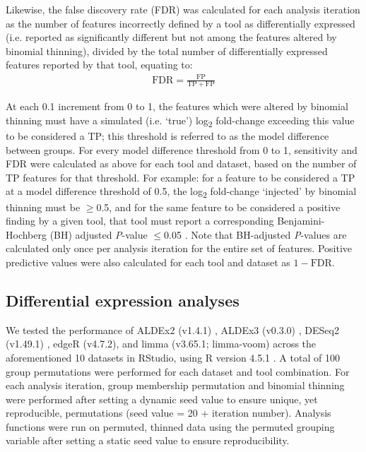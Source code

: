 \documentclass{article}
\begin{document}
Likewise, the false discovery rate (FDR) was calculated for each analysis iteration as the number of features incorrectly defined by a tool as differentially expressed (i.e. reported as significantly different but not among the features altered by binomial thinning), divided by the total number of differentially expressed features reported by that tool, equating to: 
\begin{eqnarray}
	\label{eq:FDR}
	\mathrm{FDR} = \frac{\mathrm{FP}}{\mathrm{TP} + \mathrm{FP}}
 \end{eqnarray}
 
At each 0.1 increment from 0 to 1, the features which were altered by binomial thinning must have a simulated (i.e. `true') log\textsubscript{2} fold-change exceeding this value to be considered a TP; this threshold is referred to as the model difference between groups. For every model difference threshold from 0 to 1, sensitivity and FDR were calculated as above for each tool and dataset, based on the number of TP features for that threshold. For example: for a feature to be considered a TP at a model difference threshold of 0.5, the log\textsubscript{2} fold-change `injected' by binomial thinning must be $\geq$0.5, and for the same feature to be considered a positive finding by a given tool, that tool must report a corresponding Benjamini-Hochberg (BH) adjusted \textit{P}-value $\leq$0.05 \cite{benjamini:1995}. Note that BH-adjusted \textit{P}-values are calculated only once per analysis iteration for the entire set of features. Positive predictive values were also calculated for each tool and dataset as $1 - \mathrm{FDR}$.

\subsection{Differential expression analyses}
We tested the performance of ALDEx2 (v1.4.1) \cite{fernandes:2014}, ALDEx3 (v0.3.0) \cite{konnaris_uncertainty_2025}, DESeq2 (v1.49.1) \cite{love_moderated_2014}, edgeR (v4.7.2), and limma (v3.65.1; limma-voom) \cite{ritchie_limma_2015} across the aforementioned 10 datasets in RStudio, using R version 4.5.1 \cite{r_core_2025}. A total of 100 group permutations  were performed for each dataset and tool combination. For each analysis iteration, group membership permutation and binomial thinning were performed after setting a dynamic seed value to ensure unique, yet reproducible, permutations (seed value = 20 + iteration number). Analysis functions were run on permuted, thinned data using the permuted grouping variable after setting a static seed value to ensure reproducibility.
\end{document}

